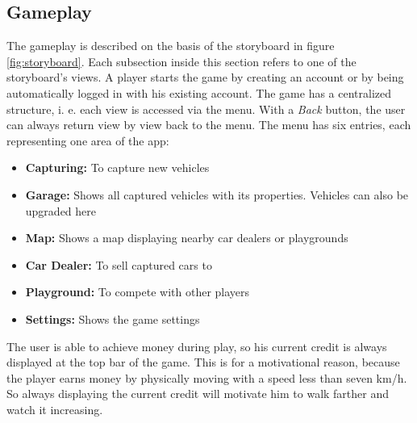 \subsection{Gameplay}\label{sec:gameplay}
The gameplay is described on the basis of the storyboard in figure \ref{fig:storyboard}. Each subsection inside this section refers to one of the storyboard's views. A player starts the game by creating an account or by being automatically logged in with his existing account.
The game has a centralized structure, i. e. each view is accessed via the menu. With a \emph{Back} button, the user can always return view by view back to the menu. The menu has six entries, each representing one area of the app:
\begin{itemize}
  \item\textbf{Capturing:} To capture new vehicles
  \item\textbf{Garage:} Shows all captured vehicles with its properties. Vehicles can also be upgraded here
  \item\textbf{Map:} Shows a map displaying nearby car dealers or playgrounds
  \item\textbf{Car Dealer:} To sell captured cars to
  \item\textbf{Playground:} To compete with other players
  \item\textbf{Settings:} Shows the game settings
\end{itemize}
The user is able to achieve money during play, so his current credit is always displayed at the top bar of the game. This is for a motivational reason, because the player earns money by physically moving with a speed less than seven km/h. So always displaying the current credit will motivate him to walk farther and watch it increasing.


